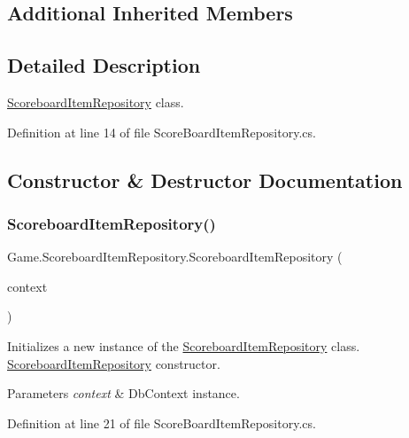 \subsection*{Additional Inherited Members}


\subsection{Detailed Description}
\mbox{\hyperlink{class_game_1_1_scoreboard_item_repository}{Scoreboard\+Item\+Repository}} class. 



Definition at line 14 of file Score\+Board\+Item\+Repository.\+cs.



\subsection{Constructor \& Destructor Documentation}
\mbox{\label{class_game_1_1_scoreboard_item_repository_a3c85955beb8e4c1cd6bde69e712e583b}} 
\subsubsection{\texorpdfstring{ScoreboardItemRepository()}{ScoreboardItemRepository()}}
{\footnotesize\ttfamily Game.\+Scoreboard\+Item\+Repository.\+Scoreboard\+Item\+Repository (\begin{DoxyParamCaption}\item[{Db\+Context}]{context }\end{DoxyParamCaption})}



Initializes a new instance of the \mbox{\hyperlink{class_game_1_1_scoreboard_item_repository}{Scoreboard\+Item\+Repository}} class. \mbox{\hyperlink{class_game_1_1_scoreboard_item_repository}{Scoreboard\+Item\+Repository}} constructor. 


\begin{DoxyParams}{Parameters}
{\em context} & Db\+Context instance.\\
\hline
\end{DoxyParams}


Definition at line 21 of file Score\+Board\+Item\+Repository.\+cs.



